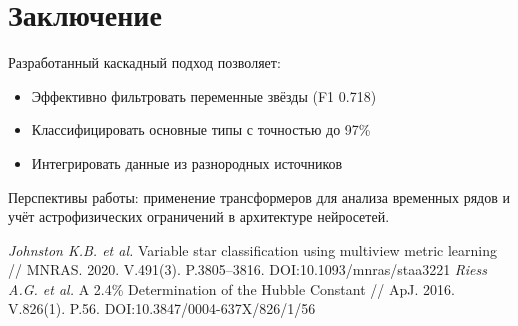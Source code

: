 \documentclass[oneside, a5paper,10pt]{article}
\begin{document}
{

\section{Заключение}
Разработанный каскадный подход позволяет:
\begin{itemize}
  \item Эффективно фильтровать переменные звёзды (F1 0.718)
  \item Классифицировать основные типы с точностью до 97\% 
  \item Интегрировать данные из разнородных источников
\end{itemize}

Перспективы работы: применение трансформеров для анализа временных рядов и учёт астрофизических ограничений в архитектуре нейросетей.

\begin{thebibliography}{9}
  \textit{Johnston K.B. et al.} Variable star classification using multiview metric learning // MNRAS. 2020. V.491(3). P.3805–3816. DOI:10.1093/mnras/staa3221
  \textit{Riess A.G. et al.} A 2.4\% Determination of the Hubble Constant // ApJ. 2016. V.826(1). P.56. DOI:10.3847/0004-637X/826/1/56
\end{thebibliography}
}
\end{document}
